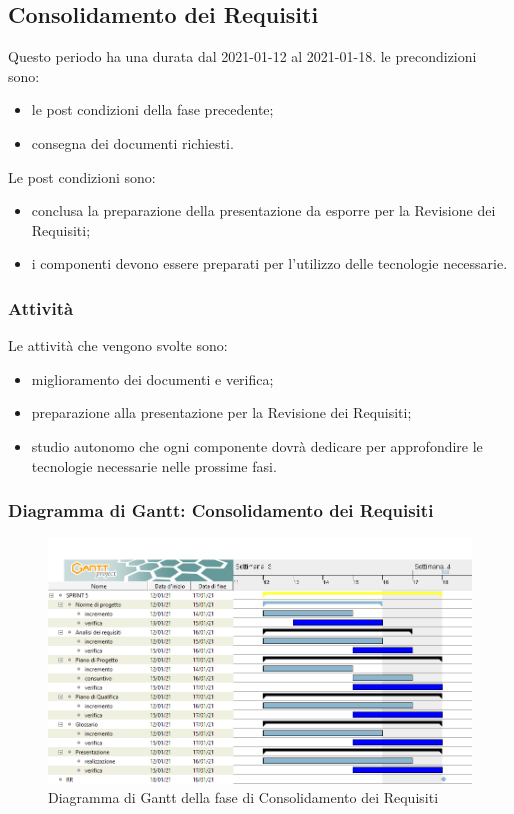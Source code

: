 \newpage
\subsection{Consolidamento dei Requisiti}
Questo periodo ha una durata dal 2021-01-12 al 2021-01-18.
le precondizioni sono:
\begin{itemize}
	\item le post condizioni della fase precedente;
	\item consegna dei documenti richiesti.
\end{itemize}
Le post condizioni sono:
\begin{itemize}
	\item conclusa la preparazione della presentazione da esporre per la Revisione dei Requisiti;
	\item i componenti devono essere preparati per l'utilizzo delle tecnologie necessarie.
\end{itemize}
\subsubsection{Attività}
Le attività che vengono svolte sono:
\begin{itemize}
	\item miglioramento dei documenti e verifica;
	\item preparazione alla presentazione per la Revisione dei Requisiti;
	\item studio autonomo che ogni componente dovrà dedicare per approfondire le tecnologie necessarie nelle prossime fasi.
\end{itemize}
\subsubsection{Diagramma di Gantt: Consolidamento dei Requisiti}
\begin{figure}[H]
    \centering
    \includegraphics[scale = 0.4]{components/img/consolidamento_requisiti.png}
    \caption{Diagramma di Gantt della fase di Consolidamento dei Requisiti}
    \label{fig:Diagramma di Gantt, fase di Consolidamento dei Requisiti}
\end{figure}

